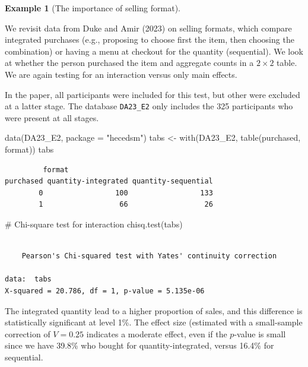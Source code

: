 \documentclass[
  11pt,
  letterpaper,
]{scrbook}
\newenvironment{Shaded}{\begin{snugshade}}{\end{snugshade}}
\newcommand{\AttributeTok}[1]{\textcolor[rgb]{0.40,0.45,0.13}{#1}}
\newcommand{\CommentTok}[1]{\textcolor[rgb]{0.37,0.37,0.37}{#1}}
\newcommand{\FunctionTok}[1]{\textcolor[rgb]{0.28,0.35,0.67}{#1}}
\newcommand{\NormalTok}[1]{\textcolor[rgb]{0.00,0.23,0.31}{#1}}
\newcommand{\OtherTok}[1]{\textcolor[rgb]{0.00,0.23,0.31}{#1}}
\newcommand{\StringTok}[1]{\textcolor[rgb]{0.13,0.47,0.30}{#1}}
\theoremstyle{definition}
\newtheorem{example}{Example}[chapter]
\theoremstyle{definition}
\theoremstyle{remark}
\begin{document}
\begin{example}[The importance of selling
format]\protect\hypertarget{exm-sellingformat}{}\label{exm-sellingformat}

We revisit data from Duke and Amir (2023) on selling formats, which
compare integrated purchases (e.g., proposing to choose first the item,
then choosing the combination) or having a menu at checkout for the
quantity (sequential). We look at whether the person purchased the item
and aggregate counts in a \(2 \times 2\) table. We are again testing for
an interaction versus only main effects.

In the paper, all participants were included for this test, but other
were excluded at a latter stage. The database \texttt{DA23\_E2} only
includes the 325 participants who were present at all stages.

\begin{Shaded}
\begin{Highlighting}[]
\FunctionTok{data}\NormalTok{(DA23\_E2, }\AttributeTok{package =} \StringTok{"hecedsm"}\NormalTok{)}
\NormalTok{tabs }\OtherTok{\textless{}{-}} \FunctionTok{with}\NormalTok{(DA23\_E2, }\FunctionTok{table}\NormalTok{(purchased, format))}
\NormalTok{tabs}
\end{Highlighting}
\end{Shaded}

\begin{verbatim}
         format
purchased quantity-integrated quantity-sequential
        0                 100                 133
        1                  66                  26
\end{verbatim}

\begin{Shaded}
\begin{Highlighting}[]
\CommentTok{\# Chi{-}square test for interaction}
\FunctionTok{chisq.test}\NormalTok{(tabs)}
\end{Highlighting}
\end{Shaded}

\begin{verbatim}

    Pearson's Chi-squared test with Yates' continuity correction

data:  tabs
X-squared = 20.786, df = 1, p-value = 5.135e-06
\end{verbatim}

The integrated quantity lead to a higher proportion of sales, and this
difference is statistically significant at level 1\%. The effect size
(estimated with a small-sample correction of \(V=0.25\) indicates a
moderate effect, even if the \(p\)-value is small since we have 39.8\%
who bought for quantity-integrated, versus 16.4\% for sequential.

\end{example}
\end{document}
